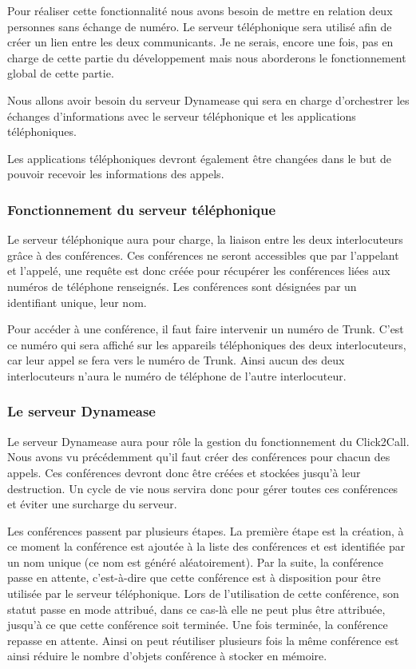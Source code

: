 Pour réaliser cette fonctionnalité nous avons besoin de mettre en relation deux personnes sans échange de numéro. Le serveur téléphonique sera utilisé afin de créer un lien entre les deux communicants. Je ne serais, encore une fois, pas en charge de cette partie du développement mais nous aborderons le fonctionnement global de cette partie.

Nous allons avoir besoin du serveur Dynamease qui sera en charge d'orchestrer les échanges d'informations avec le serveur téléphonique et les applications téléphoniques.

Les applications téléphoniques devront également être changées dans le but de pouvoir recevoir les informations des appels.

\subsubsection{Fonctionnement du serveur téléphonique}

Le serveur téléphonique aura pour charge, la liaison entre les deux interlocuteurs grâce à des conférences. Ces conférences ne seront accessibles que par l'appelant et l'appelé, une requête est donc créée pour récupérer les conférences liées aux numéros de téléphone renseignés. Les conférences sont désignées par un identifiant unique, leur nom.

Pour accéder à une conférence, il faut faire intervenir un numéro de Trunk. C'est ce numéro qui sera affiché sur les appareils téléphoniques des deux interlocuteurs, car leur appel se fera vers le numéro de Trunk. Ainsi aucun des deux interlocuteurs n'aura le numéro de téléphone de l'autre interlocuteur.

\subsubsection{Le serveur Dynamease}

Le serveur Dynamease aura pour rôle la gestion du fonctionnement du Click2Call. Nous avons vu précédemment qu'il faut créer des conférences pour chacun des appels. Ces conférences devront donc être créées et stockées jusqu'à leur destruction. Un cycle de vie nous servira donc pour gérer toutes ces conférences et éviter une surcharge du serveur.

Les conférences passent par plusieurs étapes. La première étape est la création, à ce moment la conférence est ajoutée à la liste des conférences et est identifiée par un nom unique (ce nom est généré aléatoirement). Par la suite, la conférence passe en attente, c'est-à-dire que cette conférence est à disposition pour être utilisée par le serveur téléphonique. Lors de l'utilisation de cette conférence, son statut passe en mode attribué, dans ce cas-là elle ne peut plus être attribuée, jusqu'à ce que cette conférence soit terminée. Une fois terminée, la conférence repasse en attente. Ainsi on peut réutiliser plusieurs fois la même conférence est ainsi réduire le nombre d'objets conférence à stocker en mémoire.

